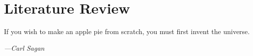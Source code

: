 \documentclass[class=report,11pt,crop=false]{standalone}
\begin{document}
\ifstandalone
\tableofcontents
\fi
\chapter{Literature Review \label{ch:literature}}
\epigraph{If you wish to make an apple pie from scratch, you must first invent the universe.}%
    {\emph{---Carl Sagan}}
\vspace{0.5cm}
    

\end{document}
